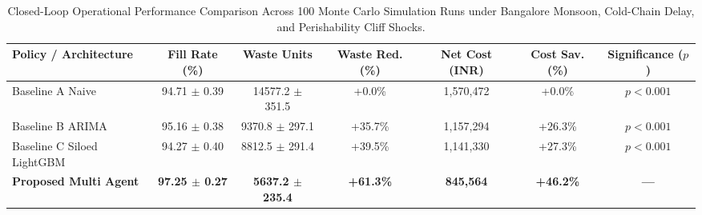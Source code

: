 
\begin{table}[t]
\centering
\caption{Closed-Loop Operational Performance Comparison Across 100 Monte Carlo Simulation Runs under Bangalore Monsoon, Cold-Chain Delay, and Perishability Cliff Shocks.}
\label{tab:simulation_results}
\begin{tabular}{lcccccc}
\hline\hline
\textbf{Policy / Architecture} & \textbf{Fill Rate (\%)} & \textbf{Waste Units} & \textbf{Waste Red. (\%)} & \textbf{Net Cost (INR)} & \textbf{Cost Sav. (\%)} & \textbf{Significance ($p$)} \\
\hline
Baseline A Naive & 94.71 $\pm$ 0.39 & 14577.2 $\pm$ 351.5 & +0.0\% & 1,570,472 & +0.0\% & $p < 0.001$ \\
Baseline B ARIMA & 95.16 $\pm$ 0.38 & 9370.8 $\pm$ 297.1 & +35.7\% & 1,157,294 & +26.3\% & $p < 0.001$ \\
Baseline C Siloed LightGBM & 94.27 $\pm$ 0.40 & 8812.5 $\pm$ 291.4 & +39.5\% & 1,141,330 & +27.3\% & $p < 0.001$ \\
\textbf{Proposed Multi Agent} & \textbf{97.25 $\pm$ 0.27} & \textbf{5637.2 $\pm$ 235.4} & \textbf{+61.3\%} & \textbf{845,564} & \textbf{+46.2\%} & \textbf{---} \\
\hline\hline
\end{tabular}
\end{table}
